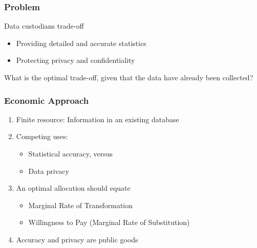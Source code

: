 \begin{frame}[allowframebreaks]%
\frametitle{Problem}

{\Large Data custodians trade-off}\vspace*{.25in}
\begin{itemize}
	\item Providing detailed and accurate statistics \vspace*{.25in}
	\item Protecting privacy and confidentiality \vspace*{.5in}
\end{itemize}
{\Large What is the optimal trade-off, given that the data have already been collected?}

\end{frame}%
%

\begin{frame}[allowframebreaks]%
\frametitle{Economic Approach}
\begin{enumerate}
	\item Finite resource: Information in an existing database\vspace{.25in}
	\item Competing uses:
	\begin{itemize}
		\item Statistical accuracy, versus
		\item Data privacy\vspace{.25in}
	\end{itemize}

	\item An optimal allocation should equate
	\begin{itemize}
		\item Marginal Rate of Transformation
		\item Willingness to Pay (Marginal Rate of Substitution)\vspace{.25in}
	\end{itemize}
	\item Accuracy and privacy are public goods
\end{enumerate}


\end{frame}%
%


